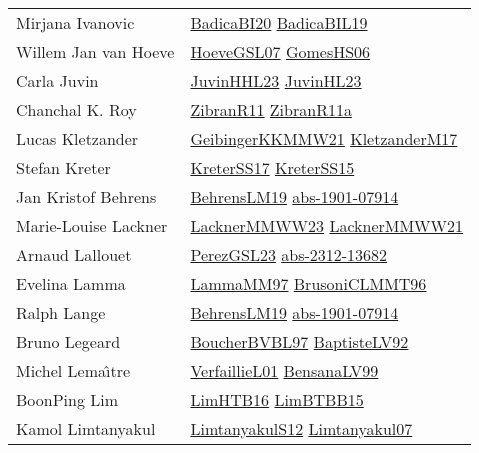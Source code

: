 {\begin{longtable}{p{4cm}p{20cm}}
Mirjana Ivanovic & \href{}{BadicaBI20}\cite{BadicaBI20} \href{papers/BadicaBIL19.pdf}{BadicaBIL19}\cite{BadicaBIL19} \\
Willem Jan van Hoeve & \href{papers/HoeveGSL07.pdf}{HoeveGSL07}\cite{HoeveGSL07} \href{papers/GomesHS06.pdf}{GomesHS06}\cite{GomesHS06} \\
Carla Juvin & \href{papers/JuvinHHL23.pdf}{JuvinHHL23}\cite{JuvinHHL23} \href{papers/JuvinHL23.pdf}{JuvinHL23}\cite{JuvinHL23} \\
Chanchal K. Roy & \href{papers/ZibranR11.pdf}{ZibranR11}\cite{ZibranR11} \href{papers/ZibranR11a.pdf}{ZibranR11a}\cite{ZibranR11a} \\
Lucas Kletzander & \href{papers/GeibingerKKMMW21.pdf}{GeibingerKKMMW21}\cite{GeibingerKKMMW21} \href{papers/KletzanderM17.pdf}{KletzanderM17}\cite{KletzanderM17} \\
Stefan Kreter & \href{articles/KreterSS17.pdf}{KreterSS17}\cite{KreterSS17} \href{papers/KreterSS15.pdf}{KreterSS15}\cite{KreterSS15} \\
Jan Kristof Behrens & \href{papers/BehrensLM19.pdf}{BehrensLM19}\cite{BehrensLM19} \href{articles/abs-1901-07914.pdf}{abs-1901-07914}\cite{abs-1901-07914} \\
Marie{-}Louise Lackner & \href{articles/LacknerMMWW23.pdf}{LacknerMMWW23}\cite{LacknerMMWW23} \href{papers/LacknerMMWW21.pdf}{LacknerMMWW21}\cite{LacknerMMWW21} \\
Arnaud Lallouet & \href{papers/PerezGSL23.pdf}{PerezGSL23}\cite{PerezGSL23} \href{articles/abs-2312-13682.pdf}{abs-2312-13682}\cite{abs-2312-13682} \\
Evelina Lamma & \href{articles/LammaMM97.pdf}{LammaMM97}\cite{LammaMM97} \href{papers/BrusoniCLMMT96.pdf}{BrusoniCLMMT96}\cite{BrusoniCLMMT96} \\
Ralph Lange & \href{papers/BehrensLM19.pdf}{BehrensLM19}\cite{BehrensLM19} \href{articles/abs-1901-07914.pdf}{abs-1901-07914}\cite{abs-1901-07914} \\
Bruno Legeard & \href{}{BoucherBVBL97}\cite{BoucherBVBL97} \href{papers/BaptisteLV92.pdf}{BaptisteLV92}\cite{BaptisteLV92} \\
Michel Lema{\^{\i}}tre & \href{papers/VerfaillieL01.pdf}{VerfaillieL01}\cite{VerfaillieL01} \href{articles/BensanaLV99.pdf}{BensanaLV99}\cite{BensanaLV99} \\
BoonPing Lim & \href{papers/LimHTB16.pdf}{LimHTB16}\cite{LimHTB16} \href{papers/LimBTBB15.pdf}{LimBTBB15}\cite{LimBTBB15} \\
Kamol Limtanyakul & \href{articles/LimtanyakulS12.pdf}{LimtanyakulS12}\cite{LimtanyakulS12} \href{papers/Limtanyakul07.pdf}{Limtanyakul07}\cite{Limtanyakul07} \\

\end{longtable}}
